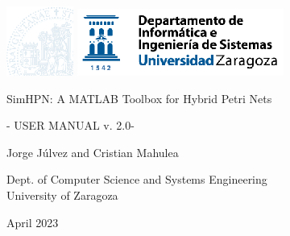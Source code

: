 
\noindent

\vfill
\includegraphics[scale=2]{figs/uz-w.eps} \hspace{5cm}  \includegraphics[scale=1.8]{figs/diis-c.eps}
\begin{center}
    \Large

\end{center}

\vfill
\begin{center}
    \Large

\end{center}

\vfill
\begin{center}
    \Huge
    SimHPN: A MATLAB Toolbox for Hybrid Petri Nets\\
\end{center}

\begin{center}
\Large
    - USER MANUAL v. 2.0-\\
\end{center}


\vfill
\begin{center}
    \Large

\end{center}
\begin{center}
   \Large
   Jorge J\'ulvez and Cristian Mahulea
\end{center}


\vfill
\begin{center}
    \Large

\end{center}




\begin{center}
\Large
    Dept. of Computer Science and Systems Engineering\\
    University of Zaragoza\\
\end{center}


\vfill
\begin{center}
\Large

\end{center}



\begin{center}
\Large
    April 2023
\end{center}


